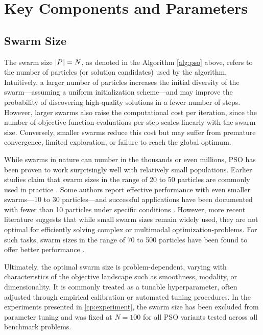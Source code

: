 {%



\section{Key Components and Parameters}

\subsection{Swarm Size}

The swarm size \( \lvert P\mkern1mu\rvert = N \), as denoted in the Algorithm \ref{alg:pso} above, refers to the number of particles (or solution candidates) used by the algorithm.  Intuitively, a larger number of particles increases the initial diversity of the swarm—assuming a uniform initialization scheme—and may improve the probability of discovering high-quality solutions in a fewer number of steps. However, larger swarms also raise the computational cost per iteration, since the number of objective function evaluations per step scales linearly with the swarm size. Conversely, smaller swarms reduce this cost but may suffer from premature convergence, limited exploration, or failure to reach the global optimum.

While swarms in nature can number in the thousands or even millions, PSO has been proven to work surprisingly well with relatively small populations. Earlier studies claim that swarm sizes in the range of 20 to 50 particles are commonly used in practice \citep{poli2007particle}. Some authors report effective performance with even smaller swarms---10 to 30 particles---and successful applications have been documented with fewer than 10 particles under specific conditions \citep{engelbrecht2007computational, vandenbergh2002analysis}. However, more recent literature suggests that while small swarm sizes remain widely used, they are not optimal for efficiently solving complex or multimodal \glspl{optimization-problem}. For such tasks, swarm sizes in the range of 70 to 500 particles have been found to offer better performance \citep{abualigah2025particle}.

Ultimately, the optimal swarm size is problem-dependent, varying with characteristics of the objective landscape such as smoothness, modality, or dimensionality. It is commonly treated as a tunable hyperparameter, often adjusted through empirical calibration or automated tuning procedures. In the experiments presented in \autoref{cp:experiment}, the swarm size has been excluded from parameter tuning and was fixed at \( N = 100 \) for all PSO variants tested across all benchmark problems.


}
